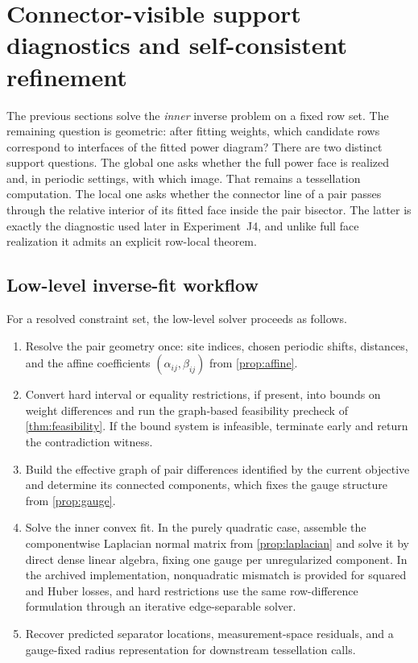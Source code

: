\documentclass[preprint,12pt]{elsarticle}
\begin{document}
\section{Connector-visible support diagnostics and self-consistent refinement}
\label{sec:refinement}

The previous sections solve the \emph{inner} inverse problem on a fixed
row set. The remaining question is geometric: after fitting weights, which
candidate rows correspond to interfaces of the fitted power diagram? There are
two distinct support questions. The global one asks whether the full power face
is realized and, in periodic settings, with which image. That remains a
tessellation computation. The local one asks whether the connector line of a
pair passes through the relative interior of its fitted face inside the pair
bisector. The latter is exactly the diagnostic used later in
Experiment~J4, and unlike full face realization it admits an explicit
row-local theorem.

\subsection{Low-level inverse-fit workflow}
For a resolved constraint set, the low-level solver proceeds as follows.
\begin{enumerate}
    \item Resolve the pair geometry once: site indices, chosen periodic shifts,
    distances, and the affine coefficients $(\alpha_{ij},\beta_{ij})$ from
    \cref{prop:affine}.
    \item Convert hard interval or equality restrictions, if present, into
    bounds on weight differences and run the graph-based feasibility precheck of
    \cref{thm:feasibility}. If the bound system is infeasible, terminate
    early and return the contradiction witness.
    \item Build the effective graph of pair differences identified by the
    current objective and determine its connected components, which fixes the
    gauge structure from \cref{prop:gauge}.
    \item Solve the inner convex fit. In the purely quadratic case, assemble the
    componentwise Laplacian normal matrix from \cref{prop:laplacian} and solve
    it by direct dense linear algebra, fixing one gauge per unregularized
    component. In the archived implementation, nonquadratic mismatch is
    provided for squared and Huber losses, and hard restrictions use the same
    row-difference formulation through an iterative edge-separable solver.
    \item Recover predicted separator locations, measurement-space residuals,
    and a gauge-fixed radius representation for downstream tessellation calls.
\end{enumerate}
\end{document}
